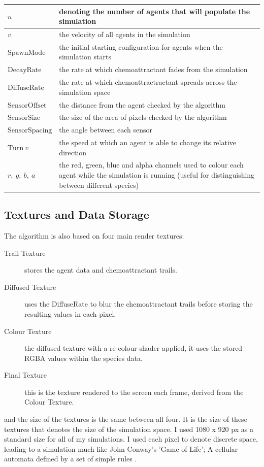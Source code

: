 \documentclass[]{report}
\begin{document}
\begin{center}
\begin{tabular}{ | m{6em} | m{7cm}| } 
  \hline
  $n$&  denoting the number of agents that will populate the simulation\\
  \hline
  $v$ & the velocity of all agents in the simulation \\ 
  \hline
  $\mathrm{SpawnMode}$ & the initial starting configuration for agents when the simulation starts\\
  \hline
   $\mathrm{DecayRate}$ &  the rate at which chemoattractant fades from the simulation\\ 
  \hline
   $\mathrm{DiffuseRate}$ & the rate at which chemoattractractant spreads across the simulation space \\ 
  \hline
   $\mathrm{SensorOffset}$ & the distance from the agent checked by the algorithm \\ 
  \hline
   $\mathrm{SensorSize}$ & the size of the area of pixels checked by the algorithm\\ 
  \hline 
  $\mathrm{SensorSpacing}$ & the angle between each sensor  \\
  \hline
   $\mathrm{Turn}\: v$ & the speed at which an agent is able to change its relative direction \\ 
  \hline
   $r,\: g,\: b,\: a$ & the red, green, blue and alpha channels used to colour each agent while the simulation is running (useful for distinguishing between different species) \\ 
  \hline
\end{tabular}
\end{center}

\subsection{Textures and Data Storage}
The algorithm is also based on four main render textures: 
\begin{description}
    \item[Trail Texture] stores the agent data and chemoattractant trails.
    \item[Diffused Texture] uses the DiffuseRate to blur the chemoattractant trails before storing the resulting values in each pixel.
    \item[Colour Texture] the diffused texture with a re-colour shader applied, it uses the stored RGBA values within the species data.
    \item[Final Texture] this is the texture rendered to the screen each frame, derived from the Colour Texture.
\end{description}
and the size of the textures is the same between all four. It is the size of these textures that denotes the size of the simulation space. I used 1080 x 920 px as a standard size for all of my simulations. I used each pixel to denote discrete space, leading to a simulation much like John Conway's 'Game of Life'; A cellular automata defined by a set of simple rules \cite{numberphile_inventing_2014, rational_animations_epic_2011}.
\end{document}
